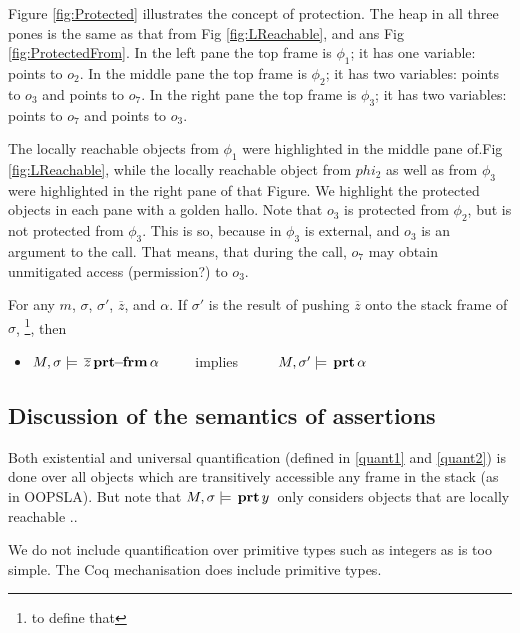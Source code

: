  Figure \ref{fig:Protected} illustrates the concept of protection. The heap in all three pones is the same as that from  Fig \ref{fig:LReachable}, and 
 ans Fig \ref{fig:ProtectedFrom}. In the left pane the top frame is $\phi_1$; it has  one variable:  points to $o_2$. In the middle pane the top frame is $\phi_2$; it has two  variables:    points to $o_3$ and  points to $o_7$. In the right pane  the top frame is $\phi_3$; it has two  variables:    points to $o_7$ and  points to $o_3$.  
 
  The locally reachable objects from $\phi_1$ were highlighted in the middle pane of.Fig \ref{fig:LReachable}, while the locally reachable object from $phi_2$ as well as from $\phi_3$ were  highlighted in the right pane of that Figure. We highlight the protected objects in each pane with a golden hallo.
 Note that $o_3$ is protected from $\phi_2$, but is not protected from $\phi_3$. This is so, because  in $\phi_3$ is external, and  $o_3$ is an argument to the call. That means, that during the call, $o_7$ may obtain unmitigated access (permission?) to $o_3$. 
 
 \begin{lemma}
 For any $m$, $\sigma$, $\sigma'$, $\overline z$, and $\alpha$. If $\sigma'$ is the result of pushing $\overline z$ onto the stack frame of $\sigma$,  \footnote{to define that}, then
 \begin{itemize}
 \item
 $ M , \sigma \models {\ensuremath{\, \overline{z}\, \mathbf{prt\!\!-\!\!frm}}\, {\alpha}}$\ \ \ \ \ implies \ \ \ \ \  $ M , \sigma' \models {\ensuremath{\, \mathbf{prt}}\, \alpha\, }$
 \end{itemize}
 
 \end{lemma}
 
 
 \subsection{Discussion of the semantics of assertions}
 
 {Both existential and universal quantification (defined in \ref{quant1} and \ref{quant2}) is done over all objects which are transitively 
accessible any frame in the stack (as in OOPSLA). But note that $M , \sigma \models {\ensuremath{\, \mathbf{prt}}\, y\, }$ only considers objects that are locally reachable ..

We do not include quantification over primitive types such as integers as \LangOO is too simple. The 
Coq mechanisation does include primitive types.}
 
